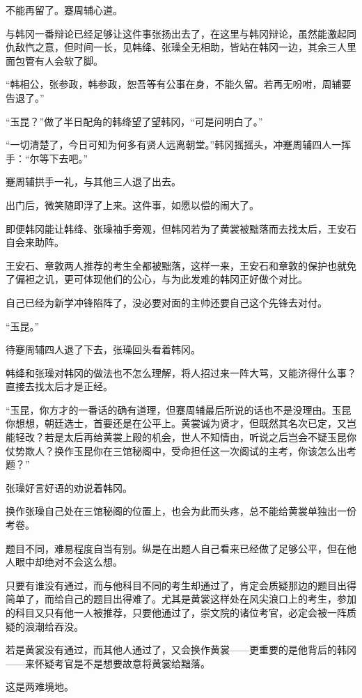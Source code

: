 不能再留了。蹇周辅心道。

与韩冈一番辩论已经足够让这件事张扬出去了，在这里与韩冈辩论，虽然能激起同仇敌忾之意，但时间一长，见韩绛、张璪全无相助，皆站在韩冈一边，其余三人里面包管有人会软了脚。

“韩相公，张参政，韩参政，恕吾等有公事在身，不能久留。若再无吩咐，周辅要告退了。”

“玉昆？”做了半日配角的韩绛望了望韩冈，“可是问明白了。”

“一切清楚了，今日可知为何多有贤人远离朝堂。”韩冈摇摇头，冲蹇周辅四人一挥手：“尔等下去吧。”

蹇周辅拱手一礼，与其他三人退了出去。

出门后，微笑随即浮了上来。这件事，如愿以偿的闹大了。

即便韩冈能让韩绛、张璪袖手旁观，但韩冈若为了黄裳被黜落而去找太后，王安石自会来助阵。

王安石、章敦两人推荐的考生全都被黜落，这样一来，王安石和章敦的保护也就免了偏袒之讥，更可体现他们的公心，与为此发难的韩冈正好做个对比。

自己已经为新学冲锋陷阵了，没必要对面的主帅还要自己这个先锋去对付。

“玉昆。”

待蹇周辅四人退了下去，张璪回头看着韩冈。

韩绛和张璪对韩冈的做法也不怎么理解，将人招过来一阵大骂，又能济得什么事？直接去找太后才是正经。

“玉昆，你方才的一番话的确有道理，但蹇周辅最后所说的话也不是没理由。玉昆你想想，朝廷选士，首要还是在公平上。黄裳诚为贤才，但既然其名次已定，又岂能轻改？若是太后再给黄裳上殿的机会，世人不知情由，听说之后岂会不疑玉昆你仗势欺人？换作玉昆你在三馆秘阁中，受命担任这一次阁试的主考，你该怎么出考题？”

张璪好言好语的劝说着韩冈。

换作张璪自己处在三馆秘阁的位置上，也会为此而头疼，总不能给黄裳单独出一份考卷。

题目不同，难易程度自当有别。纵是在出题人自己看来已经做了足够公平，但在他人眼中却绝对不会这么想。

只要有谁没有通过，而与他科目不同的考生却通过了，肯定会质疑那边的题目出得简单了，而给自己的题目出得难了。尤其是黄裳这样处在风尖浪口上的考生，参加的科目又只有他一人被推荐，只要他通过了，崇文院的诸位考官，必定会被一阵质疑的浪潮给吞没。

若是黄裳没有通过，而其他人通过了，又会换作黄裳——更重要的是他背后的韩冈——来怀疑考官是不是想要故意将黄裳给黜落。

这是两难境地。

